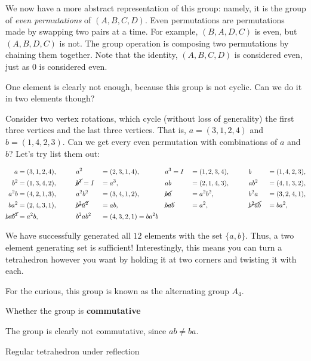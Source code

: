 \documentclass[../key.tex]{subfiles}
\begin{document}
\noindent We now have a more abstract representation of this group: namely, it is the group of \textit{even permutations} of $(A,B,C,D)$. Even permutations are permutations made by swapping two pairs at a time. For example, $(B,A,D,C)$ is even, but $(A,B,D,C)$ is not. The group operation is composing two permutations by chaining them together. Note that the identity, $(A,B,C,D)$ is considered even, just as $0$ is considered even.

One element is clearly not enough, because this group is not cyclic. Can we do it in two elements though?

Consider two vertex rotations, which cycle (without loss of generality) the first three vertices and the last three vertices. That is, $a=(3,1,2,4)$ and $b=(1,4,2,3)$. Can we get every even permutation with combinations of $a$ and $b$? Let's try list them out:

\begin{alignat*}{9}
a &=(3,1,2,4), \qquad &&a^2&&=(2,3,1,4), \qquad &&a^3=I&&=(1,2,3,4), \qquad  &&b&&=(1,4,2,3), \\
b^2&=(1,3,4,2), &&\cancel{b^3}=I&&=a^3, &&ab&&=(2,1,4,3), &&ab^2&&=(4,1,3,2), \\
a^2b&=(4,2,1,3), &&a^2b^2&&=(3,4,1,2), &&\cancel{ba}&&=a^2b^2, &&b^2a&&=(3,2,4,1), \\
ba^2&=(2,4,3,1), &&\cancel{b^2a^2}&&=ab, &&\cancel{bab}&&=a^2, &&\cancel{b^2ab}&&=ba^2, \\
\cancel{bab^2}&=a^2b, &&b^2ab^2&&=(4,3,2,1)=ba^2b &&
\end{alignat*}

\noindent We have successfully generated all $12$ elements with the set $\{a,b\}$. Thus, a two element generating set is sufficient! Interestingly, this means you can turn a tetrahedron however you want by holding it at two corners and twisting it with each.

For the curious, this group is known as the alternating group $A_4$.

\begin{inner_problem}
\item Whether the group is \textbf{commutative}
\end{inner_problem}

\noindent The group is clearly not commutative, since $ab\neq ba$.

\begin{outer_problem}
\item Regular tetrahedron under reflection
\end{outer_problem}
\end{document}
